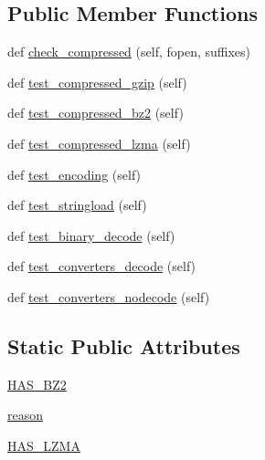 \subsection*{Public Member Functions}
\begin{DoxyCompactItemize}
\item 
def \hyperlink{classnumpy_1_1lib_1_1tests_1_1test__io_1_1LoadTxtBase_af6c7932366370cf357f0131d07927e03}{check\+\_\+compressed} (self, fopen, suffixes)
\item 
def \hyperlink{classnumpy_1_1lib_1_1tests_1_1test__io_1_1LoadTxtBase_ac23ed9a5673f6e5fa259b288173fdfd5}{test\+\_\+compressed\+\_\+gzip} (self)
\item 
def \hyperlink{classnumpy_1_1lib_1_1tests_1_1test__io_1_1LoadTxtBase_ac712503d1c3cf50b039c4b9836116991}{test\+\_\+compressed\+\_\+bz2} (self)
\item 
def \hyperlink{classnumpy_1_1lib_1_1tests_1_1test__io_1_1LoadTxtBase_aea698a026bc6d10a6cb97275276cada7}{test\+\_\+compressed\+\_\+lzma} (self)
\item 
def \hyperlink{classnumpy_1_1lib_1_1tests_1_1test__io_1_1LoadTxtBase_adfe425969ed0e2d808169d7b291d53df}{test\+\_\+encoding} (self)
\item 
def \hyperlink{classnumpy_1_1lib_1_1tests_1_1test__io_1_1LoadTxtBase_a8e46f1ddc5ecfd2ec4c2bf7e3aaa1f91}{test\+\_\+stringload} (self)
\item 
def \hyperlink{classnumpy_1_1lib_1_1tests_1_1test__io_1_1LoadTxtBase_aaf41170fe7aae9f8ddc7b2e123a1b8e7}{test\+\_\+binary\+\_\+decode} (self)
\item 
def \hyperlink{classnumpy_1_1lib_1_1tests_1_1test__io_1_1LoadTxtBase_a9373e833e37dc2f88c6782123e828fd9}{test\+\_\+converters\+\_\+decode} (self)
\item 
def \hyperlink{classnumpy_1_1lib_1_1tests_1_1test__io_1_1LoadTxtBase_a61ebe86d34f8352a61f24459ac8c449e}{test\+\_\+converters\+\_\+nodecode} (self)
\end{DoxyCompactItemize}
\subsection*{Static Public Attributes}
\begin{DoxyCompactItemize}
\item 
\hyperlink{classnumpy_1_1lib_1_1tests_1_1test__io_1_1LoadTxtBase_af47f2cb83d88424c7011a2c4cf7b7bc0}{H\+A\+S\+\_\+\+B\+Z2}
\item 
\hyperlink{classnumpy_1_1lib_1_1tests_1_1test__io_1_1LoadTxtBase_a7c4a72c8c871b16f9fc92faef23f91f2}{reason}
\item 
\hyperlink{classnumpy_1_1lib_1_1tests_1_1test__io_1_1LoadTxtBase_a8a6fa7cfdb26a59c413fd6802cabb446}{H\+A\+S\+\_\+\+L\+Z\+MA}
\end{DoxyCompactItemize}


